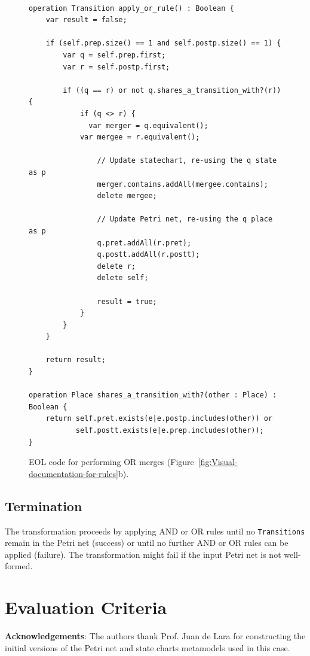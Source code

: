 \documentclass[submission,copyright,creativecommons]{eptcs}
\begin{document}
\begin{figure}
{\tiny {}

\tt
\begin{lstlisting}
operation Transition apply_or_rule() : Boolean {
	var result = false;
	
	if (self.prep.size() == 1 and self.postp.size() == 1) {
		var q = self.prep.first;
		var r = self.postp.first;
	
		if ((q == r) or not q.shares_a_transition_with?(r)) {		
			if (q <> r) {
			  var merger = q.equivalent();
  			var mergee = r.equivalent();
  			
				// Update statechart, re-using the q state as p
				merger.contains.addAll(mergee.contains);	
				delete mergee;
				
				// Update Petri net, re-using the q place as p
				q.pret.addAll(r.pret);
				q.postt.addAll(r.postt);
				delete r;
				delete self;
				
				result = true;
			}
		}
	}

	return result;
}

operation Place shares_a_transition_with?(other : Place) : Boolean {
	return self.pret.exists(e|e.postp.includes(other)) or 
	       self.postt.exists(e|e.prep.includes(other));
}

\end{lstlisting}
\rm
}{\tiny \par}

\caption{\label{fig:eol-merge-or}EOL code for performing OR merges (Figure~\ref{fig:Visual-documentation-for-rules}b).}

\end{figure}

\subsection{Termination}
The transformation proceeds by applying AND or OR rules until no \texttt{Transitions} remain in the Petri net (success) or until no further AND or OR rules can be applied (failure). The transformation might fail if the input Petri net is not well-formed.

\section{Evaluation Criteria}


\vspace{5mm}
\textbf{Acknowledgements}: The authors thank Prof. Juan de Lara for constructing the initial versions of the Petri net and state charts metamodels used in this case.



\end{document}

